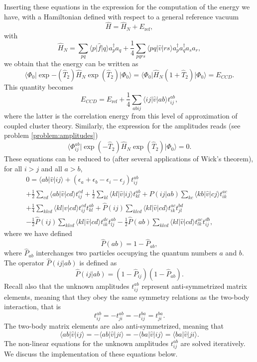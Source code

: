   Inserting these equations in the expression for the computation of
  the energy we have, with a Hamiltonian defined with respect to a
  general reference vacuum
  \[
  \hat{H}=\hat{H}_N+E_{\mathrm{ref}},
  \]
  with
  \[
  \hat{H}_N=\sum_{pq}\langle p \vert \hat{f} \vert q \rangle
  a^{\dagger}_pa_q + \frac{1}{4}\sum_{pqrs}\langle pq \vert \hat{v}
  \vert rs \rangle a^{\dagger}_pa^{\dagger}_qa_sa_r,
  \]
  we obtain that the energy can be written as
  \[
  \langle \Phi_0 \vert
  \exp{-\left(\hat{T}_2\right)}\hat{H}_N\exp{\left(\hat{T}_2\right)}\vert
  \Phi_0\rangle = \langle \Phi_0 \vert \hat{H}_N(1+\hat{T}_2)\vert
  \Phi_0\rangle = E_{CCD}.
  \]
  This quantity becomes
  \[
  E_{CCD}=E_{\mathrm{ref}}+\frac{1}{4}\sum_{abij}\langle ij \vert
  \hat{v} \vert ab \rangle t_{ij}^{ab},
  \]
  where the latter is the correlation energy from this level of
  approximation of coupled cluster  theory.  Similarly, the expression for the
  amplitudes reads (see problem \ref{problem:amplitudes})
  \[
  \langle \Phi_{ij}^{ab} \vert
  \exp{\left(-\hat{T}_2\right)}\hat{H}_N\exp{\left(\hat{T}_2\right)}\vert
  \Phi_0\rangle = 0.
  \]
  These equations can be reduced to (after several applications of
  Wick's theorem), for all $i > j$ and all $a > b$,
  \begin{align}
  0 = \langle ab \vert \hat{v} \vert ij \rangle +
  \left(\epsilon_a+\epsilon_b-\epsilon_i-\epsilon_j\right)t_{ij}^{ab}
  & \nonumber \\ +\frac{1}{2}\sum_{cd} \langle ab \vert \hat{v} \vert
  cd \rangle t_{ij}^{cd}+\frac{1}{2}\sum_{kl} \langle kl \vert \hat{v}
  \vert ij \rangle t_{kl}^{ab}+\hat{P}(ij\vert ab)\sum_{kc} \langle kb
  \vert \hat{v} \vert cj \rangle t_{ik}^{ac} & \nonumber
  \\ +\frac{1}{4}\sum_{klcd} \langle kl \vert \hat{v} \vert cd \rangle
  t_{ij}^{cd}t_{kl}^{ab}+\hat{P}(ij)\sum_{klcd} \langle kl \vert
  \hat{v} \vert cd \rangle t_{ik}^{ac}t_{jl}^{bd}& \nonumber
  \\ -\frac{1}{2}\hat{P}(ij)\sum_{klcd} \langle kl \vert \hat{v} \vert
  cd \rangle t_{ik}^{dc}t_{lj}^{ab}-\frac{1}{2}\hat{P}(ab)\sum_{klcd}
  \langle kl \vert \hat{v} \vert cd \rangle t_{lk}^{ac}t_{ij}^{db},&
  \label{eq:ccd}
  \end{align}
  where we have defined
  \[
  \hat{P}\left(ab\right)= 1-\hat{P}_{ab},
  \]
  where $\hat{P}_{ab}$ interchanges two particles occupying the
  quantum numbers $a$ and $b$.  The operator $\hat{P}(ij\vert ab)$ is
  defined as
  \[
  \hat{P}(ij\vert ab) = (1-\hat{P}_{ij})(1-\hat{P}_{ab}).
  \]
  Recall also that the unknown amplitudes $t_{ij}^{ab}$ represent
  anti-symmetrized matrix elements, meaning that they obey the same
  symmetry relations as the two-body interaction, that is
  \[
  t_{ij}^{ab}=-t_{ji}^{ab}=-t_{ij}^{ba}=t_{ji}^{ba}.
  \]
  The two-body matrix elements are also anti-symmetrized, meaning that
  \[
  \langle ab \vert \hat{v} \vert ij \rangle = -\langle ab \vert
  \hat{v} \vert ji \rangle= -\langle ba \vert \hat{v} \vert ij
  \rangle=\langle ba \vert \hat{v} \vert ji \rangle.
  \]
  The non-linear equations for the unknown amplitudes $t_{ij}^{ab}$
  are solved iteratively. We discuss the implementation of these
  equations below.

